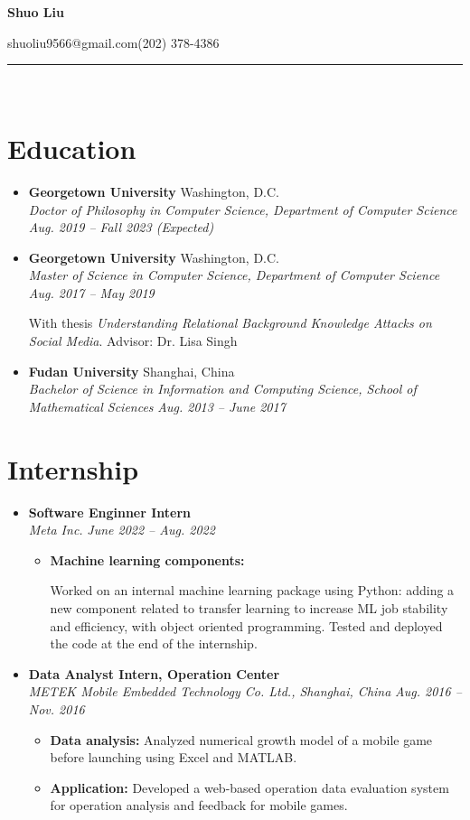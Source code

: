 \documentclass[letterpaper,11pt]{article}
\makeatletter
\newcommand{\resumeItem}[2]{
  \vspace{-3pt}
  \item{
    \textbf{#1}{#2}
  }
}
\newcommand{\resumeSubheading}[4]{
  \vspace{-7pt}\item
      \textbf{#1} \hfill #2 \\
      \textit{\small#3} \hfill \textit{\small #4}
  \vspace{-4pt}
}
\newcommand{\resumeSubHeadingListStart}{\begin{itemize}[leftmargin=*]}
\newcommand{\resumeSubHeadingListEnd}{\end{itemize}}
\newcommand{\resumeItemListStart}{\begin{itemize}}
\newcommand{\resumeItemListEnd}{\end{itemize}\vspace{-5pt}}
\makeatother
\begin{document}
\begin{center}
\textbf{\huge Shuo Liu}

\vspace{5pt}
shuoliu9566@gmail.com\qquad (202) 378-4386

\date{\today}

\end{center}
\vspace{-15pt}
\noindent\rule{\textwidth}{1.5pt}\\
\vspace{-5pt}
\section{Education}
  \resumeSubHeadingListStart
    \resumeSubheading
      {Georgetown University}{Washington, D.C.}
      {Doctor of Philosophy in Computer Science\emph{, Department of Computer Science}}{Aug. 2019 -- Fall 2023 (Expected)}
    \resumeSubheading
      {Georgetown University}{Washington, D.C.}
      {Master of Science in Computer Science\emph{, Department of Computer Science}}{Aug. 2017 -- May 2019}

      \begin{small}{With thesis \emph{Understanding Relational Background Knowledge Attacks on Social Media}. Advisor: Dr. Lisa Singh}\end{small}
    \resumeSubheading
      {Fudan University}{Shanghai, China}
      {Bachelor of Science in Information and Computing Science\emph{, School of Mathematical Sciences}}{Aug. 2013 -- June 2017}
  \resumeSubHeadingListEnd


\section{Internship}
  \resumeSubHeadingListStart
    \resumeSubheading
      {Software Enginner Intern}{}
      {Meta Inc.}{June 2022 -- Aug. 2022}
      \resumeItemListStart
        \resumeItem{Machine learning components:}{}
          {Worked on an internal machine learning package using Python: adding a new component related to transfer learning to increase ML job stability and efficiency, with object oriented programming. Tested and deployed the code at the end of the internship.}
      \resumeItemListEnd
    \resumeSubheading
      {Data Analyst Intern, Operation Center}{}
      {METEK Mobile Embedded Technology Co. Ltd., Shanghai, China}{Aug. 2016 -- Nov. 2016}
      \resumeItemListStart
        \resumeItem{Data analysis: }
          {Analyzed numerical growth model of a mobile game before launching using Excel and MATLAB.}
        \resumeItem{Application: }
          {Developed a web-based operation data evaluation system for operation analysis and feedback for mobile games.}
      \resumeItemListEnd
  \resumeSubHeadingListEnd
\end{document}
